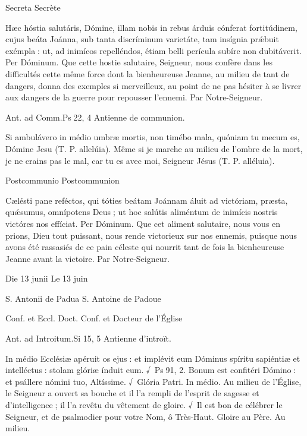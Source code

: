 \begin{paracol}{2}
Secreta
\switchcolumn
Secrète
\switchcolumn*

Hæc hóstia salutáris, Dómine, illam  nobis in rebus árduis cónferat fortitúdinem, cujus beáta Joánna, sub tanta discríminum varietáte, tam insígnia prǽbuit exémpla : ut, ad inimícos repelléndos, étiam belli perícula subíre non dubitáverit. Per Dóminum.
\switchcolumn
Que cette hostie salutaire, Seigneur,  nous confère dans les difficultés cette même force dont la bienheureuse Jeanne, au milieu de tant de dangers, donna des exemples si merveilleux, au point de ne pas hésiter à se livrer aux dangers de la guerre pour repousser l’ennemi. Par Notre-Seigneur.
\switchcolumn*

Ant. ad Comm.\hfill Ps 22, 4
\switchcolumn
Antienne de communion.
\switchcolumn*

Si ambulávero in médio umbræ mortis, non timébo mala, quóniam tu mecum es, Dómine Jesu (T. P. allelúia).
\switchcolumn
Même si je marche au milieu de l’ombre de la mort, je ne crains pas le mal, car tu es avec moi, Seigneur Jésus (T. P. alléluia).
\switchcolumn*

Postcommunio
\switchcolumn
Postcommunion
\switchcolumn*

Cælésti pane reféctos, qui tóties beátam Joánnam áluit ad victóriam, præsta, quǽsumus, omnípotens Deus ; ut hoc salútis aliméntum de inimícis nostris victóres nos effíciat. Per Dóminum.
\switchcolumn
Que cet aliment salutaire, nous vous en prions, Dieu tout puissant, nous rende victorieux sur nos ennemis, puisque nous avons été rassasiés de ce pain céleste qui nourrit tant de fois la bienheureuse Jeanne avant la victoire. Par Notre-Seigneur.
\switchcolumn*

Die 13 junii
\switchcolumn
Le 13 juin
\switchcolumn*

S. Antonii de Padua
\switchcolumn
S. Antoine de Padoue
\switchcolumn*

Conf. et Eccl. Doct.
\switchcolumn
Conf. et Docteur de l’Église
\switchcolumn*

Ant. ad Introitum.\hfill Si 15, 5
\switchcolumn
Antienne d’introït.
\switchcolumn*

In médio Ecclésiæ apéruit os ejus :  et implévit eum Dóminus spíritu sapiéntiæ et intelléctus : stolam glóriæ índuit eum. √~Ps 91, 2. Bonum est confitéri Dómino : et psállere nómini tuo, Altíssime. √~Glória Patri. In médio.
\switchcolumn
Au milieu de l’Église, le Seigneur a  ouvert sa bouche et il l’a rempli de l’esprit de sagesse et d’intelligence ; il l’a revêtu du vêtement de gloire. √~Il est bon de célébrer le Seigneur, et de psalmodier pour votre Nom, ô Très-Haut. Gloire au Père. Au milieu.
\switchcolumn*


\end{paracol}
